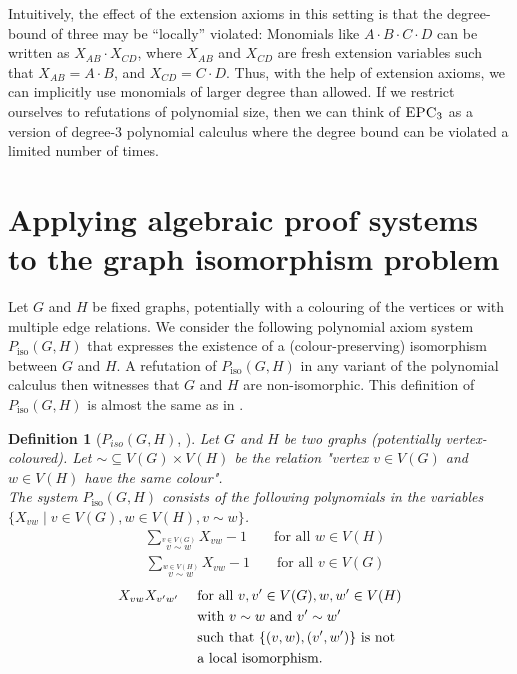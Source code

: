 \documentclass[10pt,a4paper]{article}
\newtheorem{definition}[theorem]{Definition}
\newcommand{\EPC}{\mbox{\sc EPC}}
\newcommand{\Piso}{P_{\text{iso}}}
\begin{document}
	Intuitively, the effect of the extension axioms in this setting is that the degree-bound of three may be ``locally'' violated: Monomials like $A \cdot B \cdot C \cdot D$ can be written as $X_{AB} \cdot X_{CD}$, where $X_{AB}$ and $X_{CD}$ are fresh extension variables such that $X_{AB} = A \cdot B$, and $X_{CD} = C \cdot D$. Thus, with the help of extension axioms, we can implicitly use monomials of larger degree than allowed. If we restrict ourselves to refutations of polynomial size, then we can think of $\EPC_3$ as a version of degree-$3$ polynomial calculus where the degree bound can be violated a limited number of times.
	
	
	\section{Applying algebraic proof systems to the graph isomorphism problem}
	\label{sec:PC_groheBerkholz}
	Let $G$ and $H$ be fixed graphs, potentially with a colouring of the vertices or with multiple edge relations. We consider the following polynomial axiom system $\Piso(G,H)$ that expresses the existence of a (colour-preserving) isomorphism between $G$ and $H$. A refutation of $\Piso(G,H)$ in any variant of the polynomial calculus then witnesses that $G$ and $H$ are non-isomorphic.
	This definition of $\Piso(G,H)$ is almost the same as in \cite{berkholz}.
	\begin{definition}[$P_{iso}(G,H)$, \cite{berkholz}]
		\label{def:PC_isoSystem}
		Let $G$ and $H$ be two graphs (potentially vertex-coloured). Let $\sim \subseteq V(G) \times V(H)$ be the relation "vertex $v \in V(G)$ and $w \in V(H)$ have the same colour".\\
		The system $\Piso(G,H)$ consists of the following polynomials in the variables $\{X_{vw} \mid v \in V(G), w \in V(H), v \sim w\}$.
		\begin{align}
			\label{isoAxiom1}
			&\sum_{\stackrel{v \in V(G)}{v \sim w}} X_{vw} - 1 & &\text{ for all } w \in V(H)
		\end{align}
		\begin{align}
			\label{isoAxiom2}
			&\sum_{\stackrel{w \in V(H)}{v \sim w}} X_{vw} - 1 & &\text{ for all } v \in V(G)
		\end{align}
		\begin{align}
			\label{isoAxiom3}
			&X_{vw}X_{v'w'} & &\text{ for all } v,v' \in V(G), w,w' \in V(H)\\
			& & &\text{ with } v \sim w \text{ and } v' \sim w' \notag\\ 
			& & &\text{ such that } \{(v,w),(v',w')\} \text{ is not} \notag\\
			& & & \text{ a local isomorphism.} \notag
		\end{align}
	\end{definition}
\end{document}
